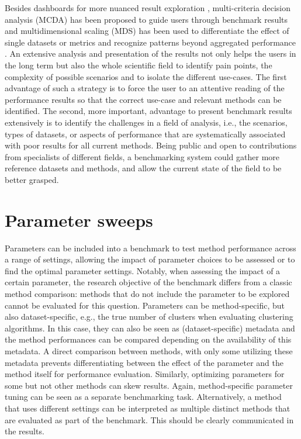 \documentclass[11pt]{article}
\begin{document}
Besides dashboards for more nuanced result exploration \cite{MariniUnknown-aq}, multi-criteria decision analysis (MCDA) \cite{Taherdoost2023-wd} has been proposed to guide users through benchmark results and multidimensional scaling (MDS) has been used to differentiate the effect of single datasets or metrics and recognize patterns beyond aggregated performance \cite{Niessl2022-fk}. An extensive analysis and presentation of the results not only helps the users in the long term but also the whole scientific field to identify pain points, the complexity of possible scenarios and to isolate the different use-cases. The first advantage of such a strategy is to force the user to an attentive reading of the performance results so that the correct use-case and relevant methods can be identified. The second, more important, advantage to present benchmark results extensively is to identify the challenges in a field of analysis, i.e., the scenarios, types of datasets, or aspects of performance that are systematically associated with poor results for all current methods. Being public and open to contributions from specialists of different fields, a benchmarking system could gather more reference datasets and methods, and allow the current state of the field to be better grasped. %


\section*{Parameter sweeps}

Parameters can be included into a benchmark to test method performance across a range of settings, allowing the impact of parameter choices to be assessed  or to find the optimal parameter settings. Notably, when assessing the impact of a certain parameter, the research objective of the benchmark differs from a classic method comparison: methods that do not include the parameter to be explored cannot be evaluated for this question. Parameters can be method-specific, but also dataset-specific, e.g., the true number of clusters when evaluating clustering algorithms. In this case, they can also be seen as (dataset-specific) metadata and the method performances can be compared depending on the availability of this metadata. A direct comparison between methods, with only some utilizing these metadata prevents differentiating between the effect of the parameter and the method itself for performance evaluation. Similarly, optimizing parameters for some but not other methods can skew results. Again, method-specific parameter tuning can be seen as a separate benchmarking task. Alternatively, a method that uses different settings can be interpreted as multiple distinct methods that are evaluated as part of the benchmark. This should be clearly communicated in the results. 
\end{document}
